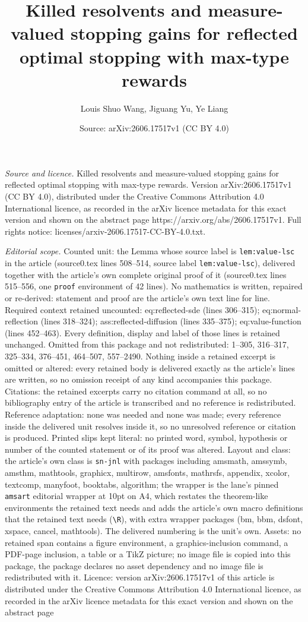 \documentclass[10pt,a4paper]{amsart}
\title[Killed resolvents and measure-valued stopping gains for refl]{Killed resolvents and measure-valued stopping gains for reflected optimal stopping with max-type rewards}
\author{Louis Shuo Wang, Jiguang Yu, Ye Liang}
\date{Source: arXiv:2606.17517v1 (CC BY 4.0)}
\begin{document}
\maketitle

\noindent\emph{Source and licence.} Killed resolvents and measure-valued stopping gains for reflected optimal stopping with max-type rewards. Version arXiv:2606.17517v1 (CC BY 4.0), distributed under the Creative Commons Attribution 4.0 International licence, as recorded in the arXiv licence metadata for this exact version and shown on the abstract page https://arxiv.org/abs/2606.17517v1. Full rights notice: licenses/arxiv-2606.17517-CC-BY-4.0.txt.\par\smallskip

\noindent\textit{Editorial scope.} Counted unit: the Lemma whose source label is \texttt{lem:value-lsc} in the article (source0.tex lines 508--514, source label \texttt{lem:value-lsc}), delivered together with the article's own complete original proof of it (source0.tex lines 515--556, one \texttt{proof} environment of 42 lines). No mathematics is written, repaired or re-derived: statement and proof are the article's own text line for line. Required context retained uncounted: eq:reflected-sde (lines 306--315); eq:normal-reflection (lines 318--324); ass:reflected-diffusion (lines 335--375); eq:value-function (lines 452--463). Every definition, display and label of those lines is retained unchanged. Omitted from this package and not redistributed: 1--305, 316--317, 325--334, 376--451, 464--507, 557--2490. Nothing inside a retained excerpt is omitted or altered: every retained body is delivered exactly as the article's lines are written, so no omission receipt of any kind accompanies this package. Citations: the retained excerpts carry no citation command at all, so no bibliography entry of the article is transcribed and no reference is redistributed. Reference adaptation: none was needed and none was made; every reference inside the delivered unit resolves inside it, so no unresolved reference or citation is produced. Printed slips kept literal: no printed word, symbol, hypothesis or number of the counted statement or of its proof was altered. Layout and class: the article's own class is \texttt{sn-jnl} with packages including amsmath, amssymb, amsthm, mathtools, graphicx, multirow, amsfonts, mathrsfs, appendix, xcolor, textcomp, manyfoot, booktabs, algorithm; the wrapper is the lane's pinned \texttt{amsart} editorial wrapper at 10pt on A4, which restates the theorem-like environments the retained text needs and adds the article's own macro definitions that the retained text needs (\texttt{\textbackslash R}), with extra wrapper packages (bm, bbm, dsfont, xspace, cancel, mathtools). The delivered numbering is the unit's own. Assets: no retained span contains a figure environment, a graphics-inclusion command, a PDF-page inclusion, a table or a TikZ picture; no image file is copied into this package, the package declares no asset dependency and no image file is redistributed with it. Licence: version arXiv:2606.17517v1 of this article is distributed under the Creative Commons Attribution 4.0 International licence, as recorded in the arXiv licence metadata for this exact version and shown on the abstract page 
\end{document}
